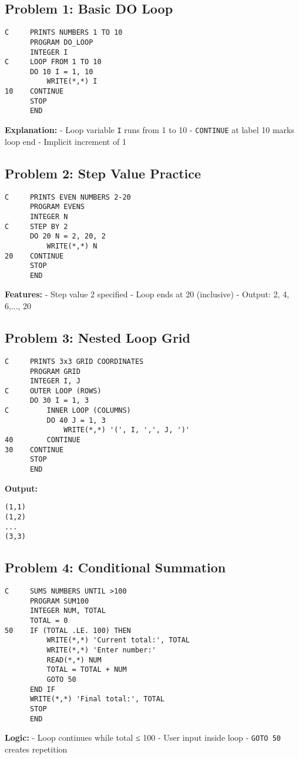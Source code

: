 \documentclass{book}
\begin{document}
\subsection*{Problem 1: Basic DO Loop}
\begin{verbatim}
C     PRINTS NUMBERS 1 TO 10
      PROGRAM DO_LOOP
      INTEGER I
C     LOOP FROM 1 TO 10
      DO 10 I = 1, 10
          WRITE(*,*) I
10    CONTINUE
      STOP
      END
\end{verbatim}
\textbf{Explanation:}
- Loop variable \texttt{I} runs from 1 to 10
- \texttt{CONTINUE} at label 10 marks loop end
- Implicit increment of 1

\subsection*{Problem 2: Step Value Practice}
\begin{verbatim}
C     PRINTS EVEN NUMBERS 2-20
      PROGRAM EVENS
      INTEGER N
C     STEP BY 2
      DO 20 N = 2, 20, 2
          WRITE(*,*) N
20    CONTINUE
      STOP
      END
\end{verbatim}
\textbf{Features:}
- Step value 2 specified
- Loop ends at 20 (inclusive)
- Output: 2, 4, 6,..., 20

\subsection*{Problem 3: Nested Loop Grid}
\begin{verbatim}
C     PRINTS 3x3 GRID COORDINATES
      PROGRAM GRID
      INTEGER I, J
C     OUTER LOOP (ROWS)
      DO 30 I = 1, 3
C         INNER LOOP (COLUMNS)
          DO 40 J = 1, 3
              WRITE(*,*) '(', I, ',', J, ')'
40        CONTINUE
30    CONTINUE
      STOP
      END
\end{verbatim}
\textbf{Output:}
\begin{verbatim}
(1,1)
(1,2)
...
(3,3)
\end{verbatim}

\subsection*{Problem 4: Conditional Summation}
\begin{verbatim}
C     SUMS NUMBERS UNTIL >100
      PROGRAM SUM100
      INTEGER NUM, TOTAL
      TOTAL = 0
50    IF (TOTAL .LE. 100) THEN
          WRITE(*,*) 'Current total:', TOTAL
          WRITE(*,*) 'Enter number:'
          READ(*,*) NUM
          TOTAL = TOTAL + NUM
          GOTO 50
      END IF
      WRITE(*,*) 'Final total:', TOTAL
      STOP
      END
\end{verbatim}
\textbf{Logic:}
- Loop continues while total ≤ 100
- User input inside loop
- \texttt{GOTO 50} creates repetition
\end{document}
